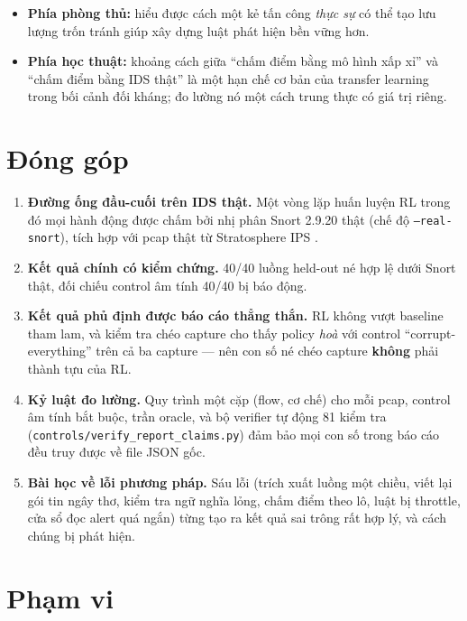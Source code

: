 \documentclass[12pt,a4paper]{report}
\begin{document}
\begin{itemize}
  \item \textbf{Phía phòng thủ:} hiểu được cách một kẻ tấn công \emph{thực sự} có thể
        tạo lưu lượng trốn tránh giúp xây dựng luật phát hiện bền vững hơn.
  \item \textbf{Phía học thuật:} khoảng cách giữa ``chấm điểm bằng mô hình xấp xỉ''
        và ``chấm điểm bằng IDS thật'' là một hạn chế cơ bản của transfer learning
        trong bối cảnh đối kháng; đo lường nó một cách trung thực có giá trị riêng.
\end{itemize}

\section{Đóng góp}

\begin{enumerate}[label=\textbf{C\arabic*.}]
  \item \textbf{Đường ống đầu-cuối trên IDS thật.} Một vòng lặp huấn luyện RL trong đó
        mọi hành động được chấm bởi nhị phân Snort 2.9.20 thật (chế độ \texttt{--real-snort}),
        tích hợp với pcap thật từ Stratosphere IPS \citep{stratosphere_ctu13}.
  \item \textbf{Kết quả chính có kiểm chứng.} 40/40 luồng held-out né hợp lệ dưới Snort
        thật, đối chiếu control âm tính 40/40 bị báo động.
  \item \textbf{Kết quả phủ định được báo cáo thẳng thắn.} RL không vượt baseline tham
        lam, và kiểm tra chéo capture cho thấy policy \emph{hoà} với control
        ``corrupt-everything'' trên cả ba capture — nên con số né chéo capture
        \textbf{không} phải thành tựu của RL.
  \item \textbf{Kỷ luật đo lường.} Quy trình một cặp (flow, cơ chế) cho mỗi pcap,
        control âm tính bắt buộc, trần oracle, và bộ verifier tự động 81 kiểm tra
        (\texttt{controls/verify\_report\_claims.py}) đảm bảo mọi con số trong báo cáo
        đều truy được về file JSON gốc.
  \item \textbf{Bài học về lỗi phương pháp.} Sáu lỗi (trích xuất luồng một chiều, viết
        lại gói tin ngây thơ, kiểm tra ngữ nghĩa lỏng, chấm điểm theo lô, luật bị
        throttle, cửa sổ đọc alert quá ngắn) từng tạo ra kết quả sai trông rất hợp lý,
        và cách chúng bị phát hiện.
\end{enumerate}

\section{Phạm vi}
\end{document}
